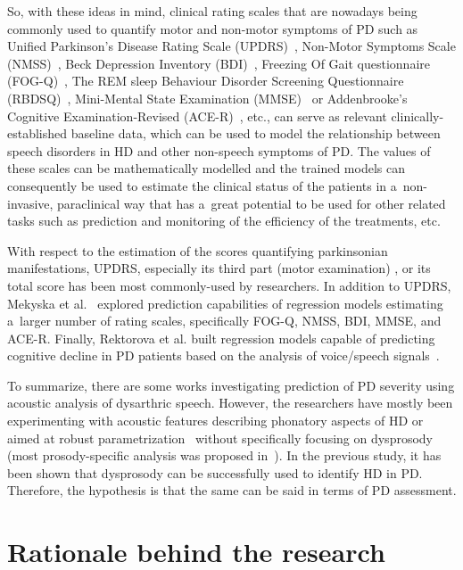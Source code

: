 So, with these ideas in mind, clinical rating scales that are nowadays being commonly used to quantify motor and non-motor symptoms of PD such as Unified Parkinson's Disease Rating Scale (UPDRS)~\cite{Fahn1987}, Non-Motor Symptoms Scale (NMSS)~\cite{Chaudhuri2007}, Beck Depression Inventory (BDI)~\cite{Beck2000}, Freezing Of Gait questionnaire (FOG-Q)~\cite{Giladi2000}, The REM sleep Behaviour Disorder Screening Questionnaire (RBDSQ)~\cite{Stiasny2007}, Mini-Mental State Examination (MMSE)~\cite{Folstein1975} or Addenbrooke's Cognitive Examination-Revised (ACE-R)~\cite{Larner2007}, etc., can serve as relevant clinically-established baseline data, which can be used to model the relationship between speech disorders in HD and other non-speech symptoms of PD. The values of these scales can be mathematically modelled and the trained models can consequently be used to estimate the clinical status of the patients in a~non-invasive, paraclinical way that has a~great potential to be used for other related tasks such as prediction and monitoring of the efficiency of the treatments, etc.

With respect to the estimation of the scores quantifying parkinsonian manifestations, UPDRS, especially its third part (motor examination) \cite{Asgari2010, Bayestehtashk2015, Eskidere2012, Peterek2013, Tsanas2010, Tsanas2010a, Tsanas2010b}, or its total score \cite{Eskidere2012, Peterek2013, Tsanas2010, Tsanas2010a, Tsanas2010b} has been most commonly-used by researchers. In addition to UPDRS, Mekyska et al.~\cite{Smekal2015c} explored prediction capabilities of regression models estimating a~larger number of rating scales, specifically FOG-Q, NMSS, BDI, MMSE, and ACE-R. Finally, Rektorova et al. built regression models capable of predicting cognitive decline in PD patients based on the analysis of voice/speech signals~\cite{Rektorova2016}.

To summarize, there are some works investigating prediction of PD severity using acoustic analysis of dysarthric speech. However, the researchers have mostly been experimenting with acoustic features describing phonatory aspects of HD or aimed at robust parametrization~\cite{Mekyska2015, Smekal2015c} without specifically focusing on dysprosody (most prosody-specific analysis was proposed in~\cite{Rektorova2016}). In the previous study, it has been shown that dysprosody can be successfully used to identify HD in PD. Therefore, the hypothesis is that the same can be said in terms of PD assessment.

\section{Rationale behind the research}
\label{ch5_2}


